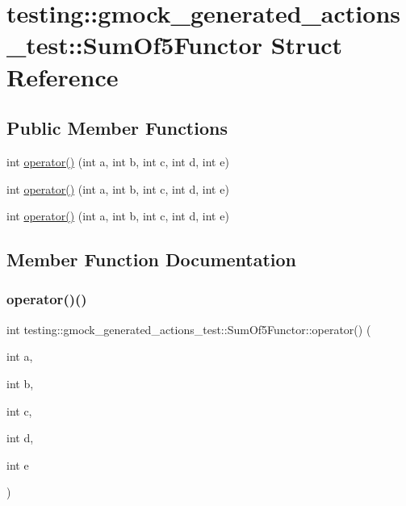 \hypertarget{structtesting_1_1gmock__generated__actions__test_1_1_sum_of5_functor}{}\section{testing\+::gmock\+\_\+generated\+\_\+actions\+\_\+test\+::Sum\+Of5\+Functor Struct Reference}
\label{structtesting_1_1gmock__generated__actions__test_1_1_sum_of5_functor}
\subsection*{Public Member Functions}
\begin{DoxyCompactItemize}
\item 
int \mbox{\hyperlink{structtesting_1_1gmock__generated__actions__test_1_1_sum_of5_functor_aa3d751efb237e12ecdf1528f2b73da04}{operator()}} (int a, int b, int c, int d, int e)
\item 
int \mbox{\hyperlink{structtesting_1_1gmock__generated__actions__test_1_1_sum_of5_functor_aa3d751efb237e12ecdf1528f2b73da04}{operator()}} (int a, int b, int c, int d, int e)
\item 
int \mbox{\hyperlink{structtesting_1_1gmock__generated__actions__test_1_1_sum_of5_functor_aa3d751efb237e12ecdf1528f2b73da04}{operator()}} (int a, int b, int c, int d, int e)
\end{DoxyCompactItemize}


\subsection{Member Function Documentation}
\mbox{\label{structtesting_1_1gmock__generated__actions__test_1_1_sum_of5_functor_aa3d751efb237e12ecdf1528f2b73da04}} 
\subsubsection{\texorpdfstring{operator()()}{operator()()}\hspace{0.1cm}{\footnotesize\ttfamily [1/3]}}
{\footnotesize\ttfamily int testing\+::gmock\+\_\+generated\+\_\+actions\+\_\+test\+::\+Sum\+Of5\+Functor\+::operator() (\begin{DoxyParamCaption}\item[{int}]{a,  }\item[{int}]{b,  }\item[{int}]{c,  }\item[{int}]{d,  }\item[{int}]{e }\end{DoxyParamCaption})\hspace{0.3cm}{\ttfamily [inline]}}


